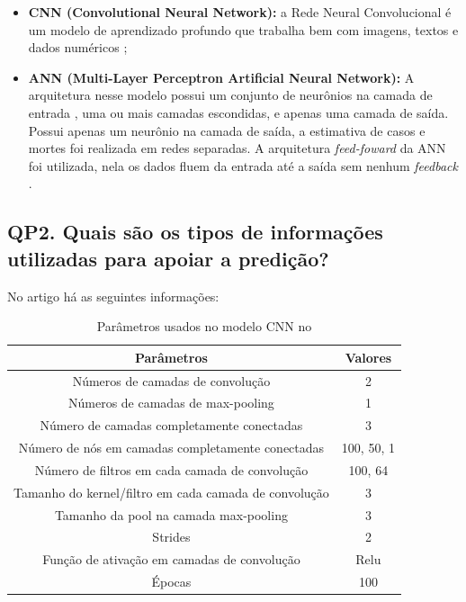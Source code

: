 \begin{itemize}
    
    \item \textbf{CNN (Convolutional Neural Network):} a Rede Neural Convolucional é um modelo de aprendizado profundo que trabalha bem com imagens, textos e dados numéricos \cite{Nikita};\\

    \item \textbf{ANN (Multi-Layer Perceptron Artificial Neural Network):}  A arquitetura nesse modelo possui um conjunto de neurônios na camada de entrada , uma ou mais camadas escondidas, e apenas uma camada de saída. Possui apenas um neurônio na camada de saída, a estimativa de casos e mortes foi realizada em redes separadas. A arquitetura \textit{feed-foward} da ANN foi utilizada, nela os dados fluem da entrada até a saída sem nenhum \textit{feedback} \cite{DeCarvalho}. \\
\end{itemize}    


\subsection{QP2. Quais são os tipos de informações utilizadas para apoiar a predição?}

No artigo \cite{Nikita} há as seguintes informações:

\begin{table}[h]
    \centering
    \begin{tabular}{|c|c|}
        \hline
        \textbf{Parâmetros} &  \textbf{Valores} \\
         \hline
         Números de camadas de convolução & 2 \\
         \hline
         Números de camadas de max-pooling & 1 \\
         \hline
         Número de camadas completamente conectadas & 3 \\
         \hline
         Número de nós em camadas completamente conectadas & 100, 50, 1 \\
         \hline
         Número de filtros em cada camada de convolução & 100, 64 \\
         \hline
         Tamanho do kernel/filtro em cada camada de convolução & 3 \\
         \hline
         Tamanho da pool na camada max-pooling & 3 \\
         \hline
         Strides & 2 \\
         \hline
         Função de ativação em camadas de convolução & Relu \\
         \hline
         Épocas & 100 \\
         \hline
    \end{tabular}
    \caption{Parâmetros usados no modelo CNN no \cite{Nikita}}
    \label{tab:my_label}
\end{table}

